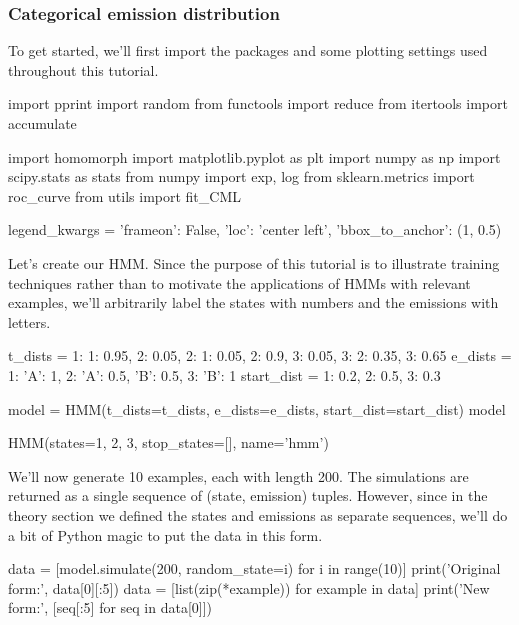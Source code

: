 \subsubsection{Categorical emission distribution}

To get started, we'll first import the packages and some plotting settings used throughout this tutorial.

\begin{NotebookIn}
import pprint
import random
from functools import reduce
from itertools import accumulate

import homomorph
import matplotlib.pyplot as plt
import numpy as np
import scipy.stats as stats
from numpy import exp, log
from sklearn.metrics import roc_curve
from utils import fit_CML

legend_kwargs = {'frameon': False,
                 'loc': 'center left',
                 'bbox_to_anchor': (1, 0.5)}
\end{NotebookIn}

Let's create our HMM. Since the purpose of this tutorial is to illustrate training techniques rather than to motivate the applications of HMMs with relevant examples, we'll arbitrarily label the states with numbers and the emissions with letters.

\begin{NotebookIn}
t_dists = {1: {1: 0.95, 2: 0.05},
           2: {1: 0.05, 2: 0.9, 3: 0.05},
           3: {2: 0.35, 3: 0.65}}
e_dists = {1: {'A': 1},
           2: {'A': 0.5, 'B': 0.5},
           3: {'B': 1}}
start_dist = {1: 0.2, 2: 0.5, 3: 0.3}

model = HMM(t_dists=t_dists, e_dists=e_dists, start_dist=start_dist)
model
\end{NotebookIn}

\begin{NotebookOut}
HMM(states={1, 2, 3},
    stop_states=[],
    name='hmm')
\end{NotebookOut}

We'll now generate 10 examples, each with length 200. The simulations are returned as a single sequence of (state, emission) tuples. However, since in the theory section we defined the states and emissions as separate sequences, we'll do a bit of Python magic to put the data in this form.

\begin{NotebookIn}
data = [model.simulate(200, random_state=i) for i in range(10)]
print('Original form:', data[0][:5])
data = [list(zip(*example)) for example in data]
print('New form:', [seq[:5] for seq in data[0]])
\end{NotebookIn}

